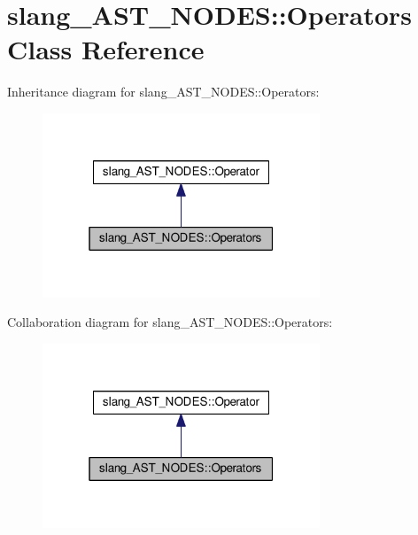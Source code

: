 \hypertarget{classslang__AST__NODES_1_1Operators}{}\section{slang\+\_\+\+A\+S\+T\+\_\+\+N\+O\+D\+ES\+:\+:Operators Class Reference}
\label{classslang__AST__NODES_1_1Operators}


Inheritance diagram for slang\+\_\+\+A\+S\+T\+\_\+\+N\+O\+D\+ES\+:\+:Operators\+:
\nopagebreak
\begin{figure}[H]
\begin{center}
\leavevmode
\includegraphics[width=235pt]{classslang__AST__NODES_1_1Operators__inherit__graph}
\end{center}
\end{figure}


Collaboration diagram for slang\+\_\+\+A\+S\+T\+\_\+\+N\+O\+D\+ES\+:\+:Operators\+:
\nopagebreak
\begin{figure}[H]
\begin{center}
\leavevmode
\includegraphics[width=235pt]{classslang__AST__NODES_1_1Operators__coll__graph}
\end{center}
\end{figure}
